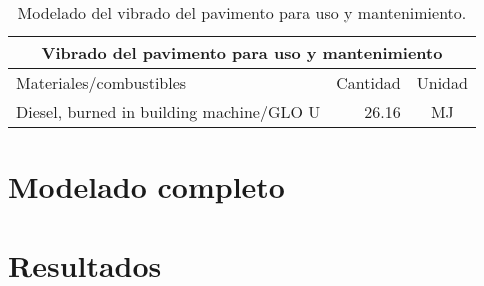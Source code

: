 \begin{table}[!htb]
\centering
\begin{tabular}{p{8cm}rc}
\toprule
\multicolumn{3}{c}{Vibrado del pavimento para uso y mantenimiento}\\
\midrule
Materiales/combustibles & Cantidad & Unidad\\
\midrule
Diesel, burned in building machine/GLO U & 26.16 & \si{MJ}\\
\bottomrule
\end{tabular}
\caption{Modelado del vibrado del pavimento para uso y mantenimiento.}
\label{modeladovibradouso}
\end{table}

\section{Modelado completo}

\section{Resultados}
